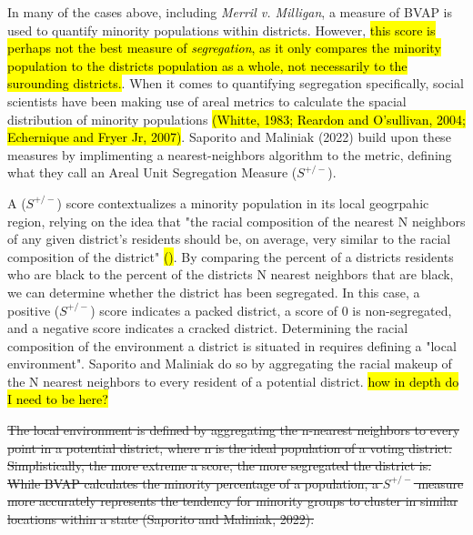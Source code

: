 \documentclass{article}
\begin{document}
In many of the cases above, including \emph{Merril v. Milligan}, a measure of BVAP is used to quantify minority populations within districts. However, \hl{this score is perhaps not the best measure of \emph{segregation}, as it only compares the minority population to the districts population as a whole, not necessarily to the surounding districts.}. When it comes to quantifying segregation specifically, social scientists have been making use of areal metrics to calculate the spacial distribution of minority populations \hl{(Whitte, 1983; Reardon and O'sullivan, 2004; Echernique and Fryer Jr, 2007)}. Saporito and Maliniak (2022) build upon these measures by implimenting a nearest-neighbors algorithm to the metric, defining what they call an Areal Unit Segregation Measure ($S^{+/-}$).
\par
A ($S^{+/-}$) score contextualizes a minority population in its local geogrpahic region, relying on the idea that "the racial composition of the nearest N neighbors of any given district’s residents should be, on average, very similar to the racial composition of the district" \hl{()}. By comparing the percent of a districts residents who are black to the percent of the districts N nearest neighbors that are black, we can determine whether the district has been segregated. In this case, a positive ($S^{+/-}$) score indicates a packed district, a score of 0 is non-segregated, and a negative score indicates a cracked district. Determining the racial composition of the environment a district is situated in requires defining a "local environment". Saporito and Maliniak do so by aggregating the racial makeup of the N nearest neighbors to every resident of a potential district. \hl{how in depth do I need to be here?}

\st{The local environment is defined by aggregating the n-nearest neighbors to every point in a potential district, where n is the ideal population of a voting district. Simplistically, the more extreme a score, the more segregated the district is. While BVAP calculates the minority percentage of a population, a $S^{+/-}$ measure more accurately represents the tendency for minority groups to cluster in similar locations within a state (Saporito and Maliniak, 2022).}
\end{document}
